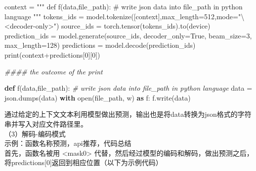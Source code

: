 \documentclass[
]{article}
\newenvironment{Shaded}{}{}
\newcommand{\BuiltInTok}[1]{\textcolor[rgb]{0.00,0.50,0.00}{#1}}
\newcommand{\CommentTok}[1]{\textcolor[rgb]{0.38,0.63,0.69}{\textit{#1}}}
\newcommand{\ControlFlowTok}[1]{\textcolor[rgb]{0.00,0.44,0.13}{\textbf{#1}}}
\newcommand{\DecValTok}[1]{\textcolor[rgb]{0.25,0.63,0.44}{#1}}
\newcommand{\ImportTok}[1]{\textcolor[rgb]{0.00,0.50,0.00}{\textbf{#1}}}
\newcommand{\KeywordTok}[1]{\textcolor[rgb]{0.00,0.44,0.13}{\textbf{#1}}}
\newcommand{\NormalTok}[1]{#1}
\newcommand{\OperatorTok}[1]{\textcolor[rgb]{0.40,0.40,0.40}{#1}}
\newcommand{\StringTok}[1]{\textcolor[rgb]{0.25,0.44,0.63}{#1}}
\newcommand{\VariableTok}[1]{\textcolor[rgb]{0.10,0.09,0.49}{#1}}
\begin{document}
\begin{Shaded}
  \begin{Highlighting}[]
    \NormalTok{context }\OperatorTok{=} \StringTok{"""}
    \StringTok{def f(data,file\_path):}
    \StringTok{    \# write json data into file\_path in python language}
    \StringTok{"""}
    \NormalTok{tokens\_ids }\OperatorTok{=}\NormalTok{ model.tokenize([context],max\_length}\OperatorTok{=}\DecValTok{512}\NormalTok{,mode}\OperatorTok{=}\StringTok{"\textbackslash{}\textless{}decoder{-}only\textgreater{}"}\NormalTok{)}
    \NormalTok{source\_ids }\OperatorTok{=}\NormalTok{ torch.tensor(tokens\_ids).to(device)}
    \NormalTok{prediction\_ids }\OperatorTok{=}\NormalTok{ model.generate(source\_ids, decoder\_only}\OperatorTok{=}\VariableTok{True}\NormalTok{, beam\_size}\OperatorTok{=}\DecValTok{3}\NormalTok{, max\_length}\OperatorTok{=}\DecValTok{128}\NormalTok{)}
    \NormalTok{predictions }\OperatorTok{=}\NormalTok{ model.decode(prediction\_ids)}
    \BuiltInTok{print}\NormalTok{(context}\OperatorTok{+}\NormalTok{predictions[}\DecValTok{0}\NormalTok{][}\DecValTok{0}\NormalTok{])}

    \CommentTok{\#\#\#\# the outcome of the print}

    \KeywordTok{def}\NormalTok{ f(data,file\_path):}
    \CommentTok{\# write json data into file\_path in python language}
    \NormalTok{    data }\OperatorTok{=}\NormalTok{ json.dumps(data)}
    \ControlFlowTok{with} \BuiltInTok{open}\NormalTok{(file\_path, }\StringTok{\textquotesingle{}w\textquotesingle{}}\NormalTok{) }\ImportTok{as}\NormalTok{ f:}
    \NormalTok{        f.write(data)}
  \end{Highlighting}
\end{Shaded}

通过给定的上下文文本利用模型做出预测，输出也是将data转换为json格式的字符串并写入对应文件路径里。\\
（3）解码-编码模式\\
示例：函数名称预测，api推荐，代码总结\\
首先，函数名被用 \textless{}mask0\textgreater{}
代替，然后经过模型的编码和解码，做出预测之后，将predictions{[}0{]}返回到相应位置（以下为示例代码）
\end{document}

